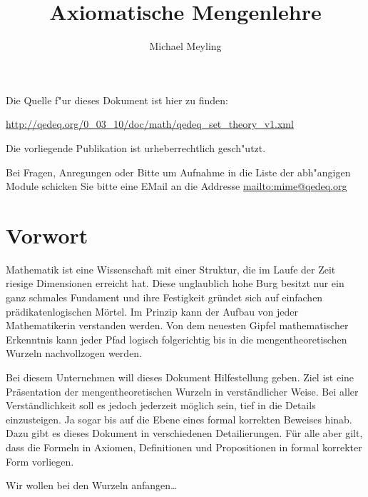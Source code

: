 \documentclass[a4paper,german,10pt,twoside]{book}
\title{Axiomatische Mengenlehre}
\author{
Michael Meyling
}
\theoremstyle{definition}
\theoremstyle{remark}
\begin{document}
\maketitle

\setlength{\parskip}{5pt plus 2pt minus 1pt}
\mbox{}
\vfill

\par
Die Quelle f{"ur} dieses Dokument ist hier zu finden:
\par
\url{http://qedeq.org/0_03_10/doc/math/qedeq_set_theory_v1.xml}

\par
Die vorliegende Publikation ist urheberrechtlich gesch{"u}tzt.
\par
Bei Fragen, Anregungen oder Bitte um Aufnahme in die Liste der abh{"a}ngigen Module schicken Sie bitte eine EMail an die Addresse \url{mailto:mime@qedeq.org}

\setlength{\parskip}{0pt}
\tableofcontents

\setlength{\parskip}{5pt plus 2pt minus 1pt}

\chapter*{Vorwort\label{ch:preface}} \label{chapter0} \hypertarget{chapter0}{}

Mathematik ist eine Wissenschaft mit einer Struktur, die im Laufe der Zeit riesige Dimensionen erreicht hat. Diese unglaublich hohe Burg besitzt nur ein ganz schmales Fundament und ihre Festigkeit gr{\"u}ndet sich auf einfachen pr{\"a}dikatenlogischen M{\"o}rtel. Im Prinzip kann der Aufbau von jeder Mathematikerin verstanden werden. Von dem neuesten Gipfel mathematischer Erkenntnis kann jeder Pfad logisch folgerichtig bis in die mengentheoretischen Wurzeln nachvollzogen werden.

\par
Bei diesem Unternehmen will dieses Dokument Hilfestellung geben. Ziel ist eine Pr{\"a}sentation der mengentheoretischen Wurzeln in verst{\"a}ndlicher Weise. Bei aller Verst{\"a}ndlichkeit soll es jedoch jederzeit m{\"o}glich sein, tief in die Details einzusteigen. Ja sogar bis auf die Ebene eines formal korrekten Beweises hinab. Dazu gibt es dieses Dokument in verschiedenen Detailierungen. F{\"u}r alle aber gilt, dass die Formeln in Axiomen, Definitionen und Propositionen in formal korrekter Form vorliegen.

\par
Wir wollen bei den Wurzeln anfangen\ldots
\end{document}
